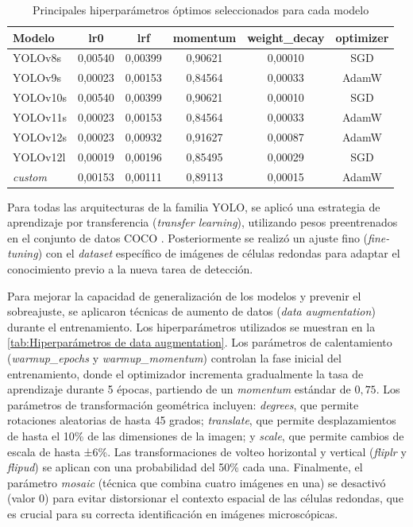 \documentclass[12pt,a4paper,onecolumn,oneside]{report}
\begin{document}
\begin{table}[H]
\caption{Principales hiperparámetros óptimos seleccionados para cada modelo}
\label{tab:Principales hiperparámetros óptimos seleccionados para cada modelo}
\centering
\begin{tabular}{lccccc}
\toprule
\textbf{Modelo} & \textbf{lr0} & \textbf{lrf} & \textbf{momentum} & \textbf{weight\_decay} & \textbf{optimizer} \\
\midrule
YOLOv8s   & 0,00540 & 0,00399 & 0,90621 & 0,00010 & SGD \\
YOLOv9s   & 0,00023 & 0,00153 & 0,84564 & 0,00033 & AdamW \\
YOLOv10s  & 0,00540 & 0,00399 & 0,90621 & 0,00010 & SGD \\
YOLOv11s  & 0,00023 & 0,00153 & 0,84564 & 0,00033 & AdamW \\
YOLOv12s  & 0,00023 & 0,00932 & 0,91627 & 0,00087 & AdamW \\
YOLOv12l  & 0,00019 & 0,00196 & 0,85495 & 0,00029 & SGD \\
\textit{custom}    & 0,00153 & 0,00111 & 0,89113 & 0,00015 & AdamW \\
\bottomrule
\end{tabular}
\end{table}

Para todas las arquitecturas de la familia YOLO, se aplicó una estrategia de aprendizaje por transferencia (\textit{transfer learning}), utilizando pesos preentrenados en el conjunto de datos COCO \cite{COCO}.
Posteriormente se realizó un ajuste fino (\textit{fine-tuning}) con el \textit{dataset} específico de imágenes de células redondas para adaptar el conocimiento previo 
a la nueva tarea de detección.

Para mejorar la capacidad de generalización de los modelos y prevenir el sobreajuste, se aplicaron técnicas de aumento de datos (\textit{data augmentation}) 
durante el entrenamiento. Los hiperparámetros utilizados se muestran en la \autoref{tab:Hiperparámetros de data augmentation}. Los parámetros de calentamiento 
(\textit{warmup\_epochs} y \textit{warmup\_momentum}) controlan la fase inicial del entrenamiento, donde el optimizador incrementa gradualmente la tasa de 
aprendizaje durante 5 épocas, partiendo de un \textit{momentum} estándar de $0,75$. Los parámetros de transformación geométrica incluyen: \textit{degrees}, que permite rotaciones 
aleatorias de hasta 45 grados; \textit{translate}, que permite desplazamientos de hasta el 10\% de las dimensiones de la imagen; y \textit{scale}, que permite 
cambios de escala de hasta ±6\%. Las transformaciones de volteo horizontal y vertical (\textit{fliplr} y \textit{flipud}) se aplican con una probabilidad del 50\% 
cada una. Finalmente, el parámetro \textit{mosaic} (técnica que combina cuatro imágenes en una) se desactivó (valor 0) para evitar distorsionar el contexto 
espacial de las células redondas, que es crucial para su correcta identificación en imágenes microscópicas.
\end{document}
